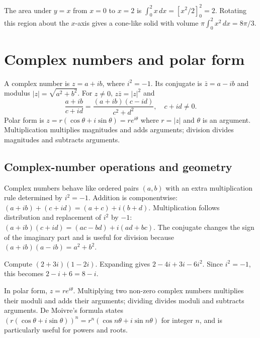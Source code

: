 \documentclass[12pt,a4paper]{article}
\begin{document}
\begin{exampleBox}The area under $y=x$ from $x=0$ to $x=2$ is $\int_0^2x\,dx=[x^2/2]_0^2=2$. Rotating this region about the $x$-axis gives a cone-like solid with volume $\pi\int_0^2x^2\,dx=8\pi/3$.
\end{exampleBox}

\section{Complex numbers and polar form}
A complex number is $z=a+ib$, where $i^2=-1$. Its conjugate is $\bar z=a-ib$ and modulus $|z|=\sqrt{a^2+b^2}$. For $z\ne0$, $z\bar z=|z|^2$ and
\[
\frac{a+ib}{c+id}=\frac{(a+ib)(c-id)}{c^2+d^2},\quad c+id\ne0.
\]
Polar form is $z=r(\cos\theta+i\sin\theta)=re^{i\theta}$ where $r=|z|$ and $\theta$ is an argument. Multiplication multiplies magnitudes and adds arguments; division divides magnitudes and subtracts arguments.
\begin{center}\end{center}
\subsection{Complex-number operations and geometry}
Complex numbers behave like ordered pairs $(a,b)$ with an extra multiplication rule determined by $i^2=-1$. Addition is componentwise: $(a+ib)+(c+id)=(a+c)+i(b+d)$. Multiplication follows distribution and replacement of $i^2$ by $-1$: $(a+ib)(c+id)=(ac-bd)+i(ad+bc)$. The conjugate changes the sign of the imaginary part and is useful for division because $(a+ib)(a-ib)=a^2+b^2$.

\begin{exampleBox}Compute $(2+3i)(1-2i)$. Expanding gives $2-4i+3i-6i^2$. Since $i^2=-1$, this becomes $2-i+6=8-i$.
\end{exampleBox}

In polar form, $z=re^{i\theta}$. Multiplying two non-zero complex numbers multiplies their moduli and adds their arguments; dividing divides moduli and subtracts arguments. De Moivre's formula states $(r(\cos\theta+i\sin\theta))^n=r^n(\cos n\theta+i\sin n\theta)$ for integer $n$, and is particularly useful for powers and roots.
\end{document}
